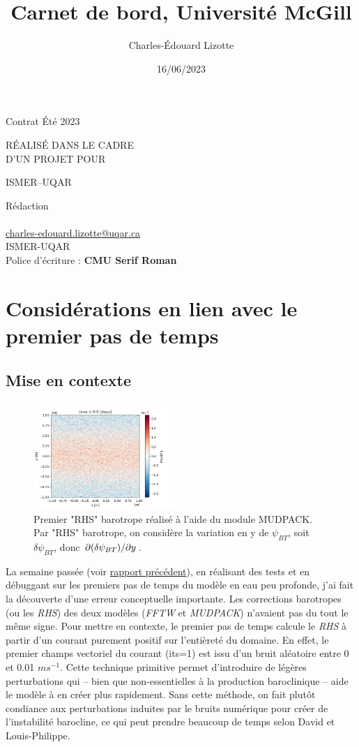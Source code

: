 \documentclass[10pt]{article}
\author{Charles-Édouard Lizotte}
\date{16/06/2023}
\title{Carnet de bord, Université McGill}
\makeatletter
\numberwithin{equation}{section}
\newcommand{\mytitlepage}{
\begin{titlepage}
\begin{center}
{\Huge \thesubtitle \par}
\vspace{2cm}
{\Huge \MakeUppercase{\thetitle} \par}
\vspace{2cm}
RÉALISÉ DANS LE CADRE\\ D'UN PROJET POUR \par
\vspace{2cm}
{\Huge ISMER--UQAR \par}
\vspace{2cm}
{\thedate}
\end{center}
\vfill
Rédaction \\
{\theauthor}\\
\url{charles-edouard.lizotte@uqar.ca}\\
ISMER-UQAR\\
Police d'écriture : \textbf{CMU Serif Roman}
\end{titlepage}
}
\newcommand{\thesubtitle}{Contrat Été 2023}
\makeatother
\begin{document}
\mytitlepage
\tableofcontents\newpage
\section{Considérations en lien avec le premier pas de temps}
\label{sec:org7f5137d}
\subsection{Mise en contexte}
\label{sec:orgb47d64c}
\begin{figure} \vspace{-\baselineskip} \centering
\centering
\includegraphics[width=0.48\textwidth]{figures/debuggage/2023_06_12_RHSuBTmudpack.png}
\caption{\label{fig:org9154c99}Premier "RHS" barotrope réalisé à l'aide du module MUDPACK. Par "RHS" barotrope, on considère la variation en y de \(\psi_{BT}\), soit \(\delta \psi_{BT}\), donc \(\pdv*{(\delta \psi_{BT})}{y}\).}
\end{figure}


La semaine passée (voir \href{rapport-2023-06-03.org}{rapport précédent}), en réalisant des tests et en débuggant sur les premiers pas de temps du modèle en eau peu profonde, j'ai fait la découverte d'une erreur conceptuelle importante.
Les corrections barotropes (ou les \emph{RHS}) des deux modèles (\emph{FFTW} et \emph{MUDPACK}) n'avaient pas du tout le même signe.
Pour mettre en contexte, le premier pas de temps calcule le \emph{RHS} à partir d'un courant purement positif sur l'entièreté du domaine.
En effet, le premier champs vectoriel du courant (its=1) est issu d'un bruit aléatoire entre 0 et 0.01 \(ms^{-1}\).
Cette technique primitive permet d'introduire de légères perturbations qui -- bien que non-essentielles à la production baroclinique -- aide le modèle à en créer plus rapidement.
Sans cette méthode, on fait plutôt condiance aux perturbations induites par le bruits numérique pour créer de l'instabilité barocline, ce qui peut prendre beaucoup de temps selon David et Louis-Philippe. \bigskip
\end{document}
